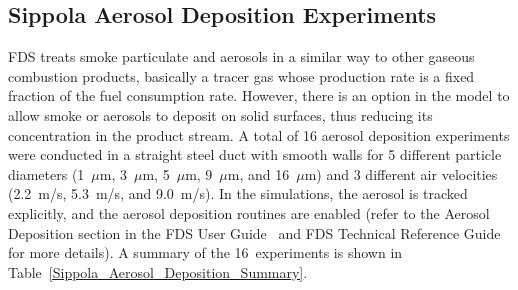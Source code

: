 \clearpage

\subsection{Sippola Aerosol Deposition Experiments}

FDS treats smoke particulate and aerosols in a similar way to other gaseous combustion products, basically a tracer gas whose production rate is a fixed fraction of the fuel consumption rate. However, there is an option in the model to allow smoke or aerosols to deposit on solid surfaces, thus reducing its concentration in the product stream. A total of 16 aerosol deposition experiments were conducted in a straight steel duct with smooth walls for 5 different particle diameters (1~$\mu$m, 3~$\mu$m, 5~$\mu$m, 9~$\mu$m, and 16~$\mu$m) and 3 different air velocities (2.2~m/s, 5.3~m/s, and 9.0~m/s). In the simulations, the aerosol is tracked explicitly, and the aerosol deposition routines are enabled (refer to the Aerosol Deposition section in the FDS User Guide~\cite{FDS_Users_Guide} and FDS Technical Reference Guide~\cite{FDS_Math_Guide} for more details). A summary of the 16~experiments is shown in Table~\ref{Sippola_Aerosol_Deposition_Summary}.

